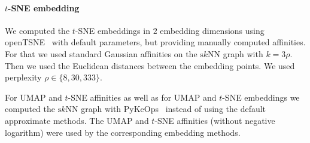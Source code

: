 \documentclass{article}
\newcommand{\sknn}{\ensuremath{\text{s}k\text{NN}}}
\theoremstyle{plain}
\theoremstyle{definition}
\theoremstyle{remark}
\begin{document}
\paragraph{$t$-SNE embedding}
We computed the $t$-SNE embeddings in $2$ embedding dimensions using openTSNE~\citep{polivcar2024opentsne} with default parameters, but providing manually computed affinities. For that we used standard Gaussian affinities on the \sknn{} graph with $k=3\rho$. Then we used the Euclidean distances between the embedding points. We used perplexity $\rho\in\{8, 30, 333\}$.

For UMAP and $t$-SNE affinities as well as for UMAP and $t$-SNE embeddings we computed the \sknn{} graph with PyKeOps~\citep{pykeops} instead of using the default approximate methods. The UMAP and $t$-SNE affinities (without negative logarithm) were used by the corresponding embedding methods.
\end{document}
